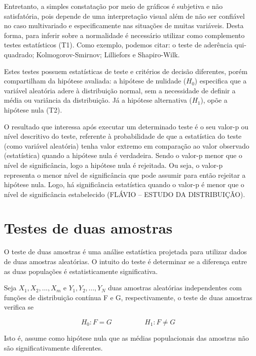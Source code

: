 Entretanto, a simples constatação por meio de gráficos é subjetiva e não satisfatória, pois depende de uma interpretação visual além de não ser confiável no caso multivariado e especificamente nas situações de muitas variáveis. Desta forma, para inferir sobre a normalidade é necessário utilizar como complemento testes estatísticos (T1).  Como exemplo, podemos citar: o teste de aderência qui-quadrado; Kolmogorov-Smirnov; Lilliefors e Shapiro-Wilk. 

Estes testes possuem estatísticas de teste e critérios de decisão diferentes, porém compartilham da hipótese avaliada: a hipótese de nulidade ($H_0$) especifica que a variável aleatória adere à distribuição normal, sem a necessidade de definir a média ou variância da distribuição. Já a hipótese alternativa ($H_1$), opõe a hipótese nula (T2). 

O resultado que interessa após executar um determinado teste é o seu valor-p ou nível descritivo do teste, referente à probabilidade de que a estatística do teste (como variável aleatória) tenha valor extremo em comparação ao valor observado (estatística) quando a hipótese nula é verdadeira. Sendo o valor-p menor que o nível de significância, logo a hipótese nula é rejeitada. Ou seja, o valor-p representa o menor nível de significância que pode assumir para então rejeitar a hipótese nula. Logo, há significância estatística quando o valor-p é menor que o nível de significância estabelecido (FLÁVIO – ESTUDO DA DISTRIBUIÇÃO).  

\section{Testes de duas amostras}
O teste de duas amostras é uma análise estatística projetada para utilizar dados de duas amostras aleatórias. O intuito do teste é determinar se a diferença entre as duas populações é estatisticamente significativa. 

Seja $X_1, X_2, ..., X_m$ e $Y_1, Y_2, ..., Y_N$ duas amostras aleatórias independentes com funções de distribuição contínua F e G, respectivamente, o teste de duas amostras verifica se

\begin{equation}
 H_0 : F = G  \hspace{2cm} H_1 : F \neq G
\label{eq:twoSample}
\end{equation}

Isto é, assume como hipótese nula que as médias populacionais das amostras não são significativamente diferentes.

